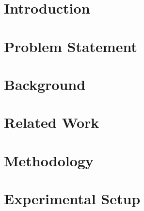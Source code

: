 \documentclass[11pt,twoside,openany]{book}
\begin{document}
\raggedbottom

\frontmatter
\pagestyle{plain} %







\newpage
\renewcommand{\contentsname}{Contents}
{\let\oldchapter\chapter
\renewcommand{\chapter}[1]{}
\tableofcontents
\renewcommand{\chapter}{\oldchapter}}


\mainmatter
\pagestyle{fancy} %

\chapter{Introduction}


\chapter{Problem Statement}


\chapter{Background}


\chapter{Related Work}


\chapter{Methodology}


\chapter{Experimental Setup}

\end{document}
